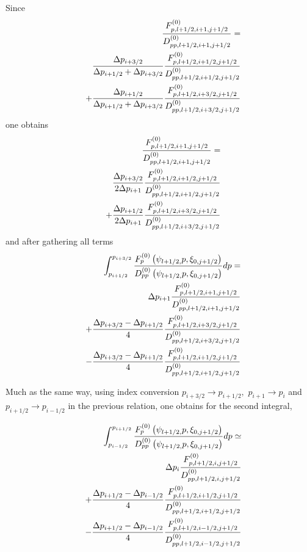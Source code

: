 Since
\begin{eqnarray}
&&\frac{F_{p,l+1/2,i+1,j+1/2}^{\left( 0\right) }}{D_{pp,l+1/2,i+1,j+1/2}^{%
\left( 0\right) }}=  \nonumber \\
&&\frac{\Delta p_{i+3/2}}{\Delta p_{i+1/2}+\Delta p_{i+3/2}}\frac{%
F_{p,l+1/2,i+1/2,j+1/2}^{\left( 0\right) }}{D_{pp,l+1/2,i+1/2,j+1/2}^{\left(
0\right) }}  \nonumber \\
&&+\frac{\Delta p_{i+1/2}}{\Delta p_{i+1/2}+\Delta p_{i+3/2}}\frac{%
F_{p,l+1/2,i+3/2,j+1/2}^{\left( 0\right) }}{D_{pp,l+1/2,i+3/2,j+1/2}^{\left(
0\right) }}
\end{eqnarray}
one obtains
\begin{eqnarray}
&&\frac{F_{p,l+1/2,i+1,j+1/2}^{\left( 0\right) }}{D_{pp,l+1/2,i+1,j+1/2}^{%
\left( 0\right) }}=  \nonumber \\
&&\frac{\Delta p_{i+3/2}}{2\Delta p_{i+1}}\frac{F_{p,l+1/2,i+1/2,j+1/2}^{%
\left( 0\right) }}{D_{pp,l+1/2,i+1/2,j+1/2}^{\left( 0\right) }}  \nonumber \\
&&+\frac{\Delta p_{i+1/2}}{2\Delta p_{i+1}}\frac{F_{p,l+1/2,i+3/2,j+1/2}^{%
\left( 0\right) }}{D_{pp,l+1/2,i+3/2,j+1/2}^{\left( 0\right) }}
\end{eqnarray}
and after gathering all terms
\begin{eqnarray}
&&\int_{p_{i+1/2}}^{p_{i+3/2}}\frac{F_{p}^{\left( 0\right) }\left( \psi
_{l+1/2,}p,\xi _{0,j+1/2}\right) }{D_{pp}^{\left( 0\right) }\left( \psi
_{l+1/2,}p,\xi _{0,j+1/2}\right) }dp=  \nonumber \\
&&\Delta p_{i+1}\frac{F_{p,l+1/2,i+1,j+1/2}^{\left( 0\right) }}{%
D_{pp,l+1/2,i+1,j+1/2}^{\left( 0\right) }}  \nonumber \\
&&+\frac{\Delta p_{i+3/2}-\Delta p_{i+1/2}}{4}\frac{%
F_{p,l+1/2,i+3/2,j+1/2}^{\left( 0\right) }}{D_{pp,l+1/2,i+3/2,j+1/2}^{\left(
0\right) }}  \nonumber \\
&&-\frac{\Delta p_{i+3/2}-\Delta p_{i+1/2}}{4}\frac{%
F_{p,l+1/2,i+1/2,j+1/2}^{\left( 0\right) }}{D_{pp,l+1/2,i+1/2,j+1/2}^{\left(
0\right) }}
\end{eqnarray}

Much as the same way, using index conversion $p_{i+3/2}\rightarrow
p_{i+1/2}, $ $p_{i+1}\rightarrow p_{i}$ and $p_{i+1/2}\rightarrow p_{i-1/2}$
in the previous relation, one obtains for the second integral,

\begin{eqnarray}
&&\int_{p_{i-1/2}}^{p_{i+1/2}}\frac{F_{p}^{\left( 0\right) }\left( \psi
_{l+1/2,}p,\xi _{0,j+1/2}\right) }{D_{pp}^{\left( 0\right) }\left( \psi
_{l+1/2,}p,\xi _{0,j+1/2}\right) }dp\simeq  \nonumber \\
&&\Delta p_{i}\frac{F_{p,l+1/2,i,j+1/2}^{\left( 0\right) }}{%
D_{pp,l+1/2,i,j+1/2}^{\left( 0\right) }}  \nonumber \\
&&+\frac{\Delta p_{i+1/2}-\Delta p_{i-1/2}}{4}\frac{%
F_{p,l+1/2,i+1/2,j+1/2}^{\left( 0\right) }}{D_{pp,l+1/2,i+1/2,j+1/2}^{\left(
0\right) }}  \nonumber \\
&&-\frac{\Delta p_{i+1/2}-\Delta p_{i-1/2}}{4}\frac{%
F_{p,l+1/2,i-1/2,j+1/2}^{\left( 0\right) }}{D_{pp,l+1/2,i-1/2,j+1/2}^{\left(
0\right) }}
\end{eqnarray}


